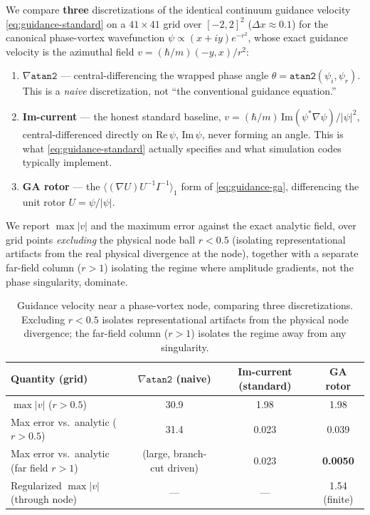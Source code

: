 \documentclass[11pt]{article}
\begin{document}
We compare \textbf{three} discretizations of the identical continuum guidance velocity \eqref{eq:guidance-standard} on a $41\times41$ grid over $[-2,2]^2$ ($\Delta x\approx0.1$) for the canonical phase-vortex wavefunction $\psi\propto(x+iy)e^{-r^2}$, whose exact guidance velocity is the azimuthal field $v=(\hbar/m)(-y,x)/r^2$:
\begin{enumerate}[leftmargin=1.4em]
\item $\nabla\mathtt{atan2}$ — central-differencing the wrapped phase angle $\theta=\mathtt{atan2}(\psi_i,\psi_r)$. This is a \emph{naive} discretization, not ``the conventional guidance equation.''
\item \textbf{Im-current} — the honest standard baseline, $v=(\hbar/m)\,\mathrm{Im}(\psi^*\nabla\psi)/|\psi|^2$, central-differenced directly on $\mathrm{Re}\,\psi$, $\mathrm{Im}\,\psi$, never forming an angle. This is what \eqref{eq:guidance-standard} actually specifies and what simulation codes typically implement.
\item \textbf{GA rotor} — the $\langle(\nabla U)U^{-1}I^{-1}\rangle_1$ form of \eqref{eq:guidance-ga}, differencing the unit rotor $U=\psi/|\psi|$.
\end{enumerate}
We report $\max|v|$ and the maximum error against the exact analytic field, over grid points \emph{excluding} the physical node ball $r<0.5$ (isolating representational artifacts from the real physical divergence at the node), together with a separate far-field column ($r>1$) isolating the regime where amplitude gradients, not the phase singularity, dominate.

\begin{table}[h]
\centering
\begin{tabular}{@{}lccc@{}}
\toprule
Quantity (grid) & $\nabla\mathtt{atan2}$ (naive) & Im-current (standard) & \textbf{GA rotor} \\
\midrule
$\max|v|$ ($r>0.5$) & 30.9 & 1.98 & 1.98 \\
Max error vs.\ analytic ($r>0.5$) & 31.4 & 0.023 & 0.039 \\
Max error vs.\ analytic (far field $r>1$) & (large, branch-cut driven) & 0.023 & \textbf{0.0050} \\
Regularized $\max|v|$ (through node) & --- & --- & 1.54 (finite) \\
\bottomrule
\end{tabular}
\caption{Guidance velocity near a phase-vortex node, comparing three discretizations. Excluding $r<0.5$ isolates representational artifacts from the physical node divergence; the far-field column ($r>1$) isolates the regime away from any singularity.}
\label{tab:vortex}
\end{table}
\end{document}
